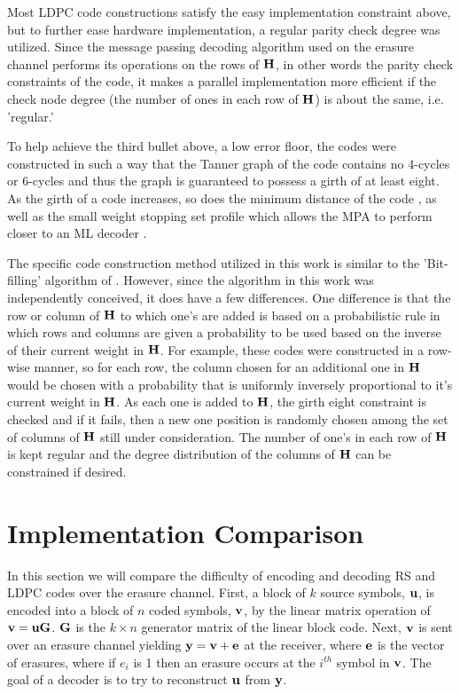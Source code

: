 \documentclass[conference]{IEEEtran}
\begin{document}
Most LDPC code constructions satisfy the easy implementation constraint above, but to further ease hardware implementation, a regular parity check degree was utilized.  Since the message passing decoding algorithm used on the erasure channel performs its operations on the rows of $\bf{H}$, in other words the parity check constraints of the code, it makes a parallel implementation more efficient if the check node degree (the number of ones in each row of $\bf{H}$) is about the same, i.e. 'regular.'


To help achieve the third bullet above, a low error floor, the codes were constructed in such a way that the Tanner graph \cite{tanner-81} of the code contains no 4-cycles or 6-cycles and thus the graph is guaranteed to possess a girth of at least eight.  As the girth of a code increases, so does the minimum distance of the code \cite{tanner-01}, as well as the small weight stopping set profile which allows the MPA to perform closer to an ML decoder \cite{Gallager}.

The specific code construction method utilized in this work is similar to the 'Bit-filling' algorithm of \cite{Campello-01}.  However, since the algorithm in this work was independently conceived, it does have a few differences.  One difference is that the row or column of $\bf{H}$ to which one's are added is based on a probabilistic rule in which rows and columns are given a probability to be used based on the inverse of their current weight in $\bf{H}$.  For example, these codes were constructed in a row-wise manner, so for each row, the column chosen for an additional one in $\bf{H}$ would be chosen with a probability that is uniformly inversely proportional to it's current weight in $\bf{H}$.  As each one is added to $\bf{H}$, the girth eight constraint is checked and if it fails, then a new one position is randomly chosen among the set of columns of $\bf{H}$ still under consideration.  The number of one's in each row of $\bf{H}$ is kept regular and the degree distribution of the columns of $\bf{H}$ can be constrained if desired.

\section{Implementation Comparison}\label{sec:TheoreticalImplementation}

In this section we will compare the difficulty of encoding and decoding RS and LDPC codes over the erasure channel.  First, a block of $k$ source symbols, $\bf{u}$, is encoded into a block of $n$ coded symbols, $\bf{v}$, by the linear matrix operation of $\bf{v}=\bf{u}\bf{G}$.  $\bf{G}$ is the $k \times n$ generator matrix of the linear block code.  Next, $\bf{v}$ is sent over an erasure channel yielding $\bf{y} = \bf{v} + \bf{e}$ at the receiver, where $\bf{e}$ is the vector of erasures, where if $e_i$ is 1 then an erasure occurs at the $i^{th}$ symbol in $\bf{v}$.  The goal of a decoder is to try to reconstruct $\bf{u}$ from $\bf{y}$.
\end{document}

